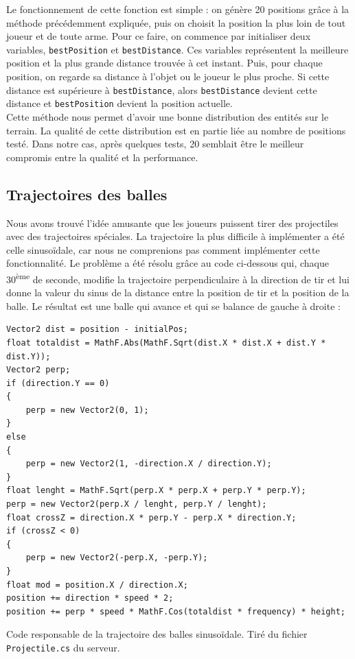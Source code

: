 \documentclass[a4paper]{article}
\begin{document}
Le fonctionnement de cette fonction est simple : on génère 20 positions grâce à la méthode précédemment expliquée, puis on choisit la position la plus loin de tout joueur et de toute arme. Pour ce faire, on commence par initialiser deux variables, \texttt{bestPosition} et \texttt{bestDistance}. Ces variables représentent la meilleure position et la plus grande distance trouvée à cet instant. Puis, pour chaque position, on regarde sa distance à l'objet ou le joueur le plus proche. Si cette distance est supérieure à \texttt{bestDistance}, alors \texttt{bestDistance} devient cette distance et \texttt{bestPosition} devient la position actuelle. \\
Cette méthode nous permet d'avoir une bonne distribution des entités sur le terrain. La qualité de cette distribution est en partie liée au nombre de positions testé. Dans notre cas, après quelques tests, 20 semblait être le meilleur compromis entre la qualité et la performance.

\subsection{Trajectoires des balles} 
Nous avons trouvé l'idée amusante que les joueurs puissent tirer des projectiles avec des trajectoires spéciales. La trajectoire la plus difficile à implémenter a été celle sinusoïdale, car nous ne comprenions pas comment implémenter cette fonctionnalité. Le problème a été résolu grâce au code ci-dessous qui, chaque 30\textsuperscript{ème} de seconde, modifie la trajectoire perpendiculaire à la direction de tir et lui donne la valeur du sinus de la distance entre la position de tir et la position de la balle. Le résultat est une balle qui avance et qui se balance de gauche à droite :


\begin{listing}[H]
\begin{verbatim}
Vector2 dist = position - initialPos;
float totaldist = MathF.Abs(MathF.Sqrt(dist.X * dist.X + dist.Y * dist.Y));
Vector2 perp;
if (direction.Y == 0)
{
    perp = new Vector2(0, 1);
}
else
{
    perp = new Vector2(1, -direction.X / direction.Y);
}
float lenght = MathF.Sqrt(perp.X * perp.X + perp.Y * perp.Y);
perp = new Vector2(perp.X / lenght, perp.Y / lenght);
float crossZ = direction.X * perp.Y - perp.X * direction.Y;
if (crossZ < 0)
{
    perp = new Vector2(-perp.X, -perp.Y);
}
float mod = position.X / direction.X;
position += direction * speed * 2;
position += perp * speed * MathF.Cos(totaldist * frequency) * height;
\end{verbatim}
\caption{Code responsable de la trajectoire des balles sinusoïdale. Tiré du fichier  \texttt{Projectile.cs} du serveur.}
\label{extrait:projectile}
\end{listing}
\end{document}
